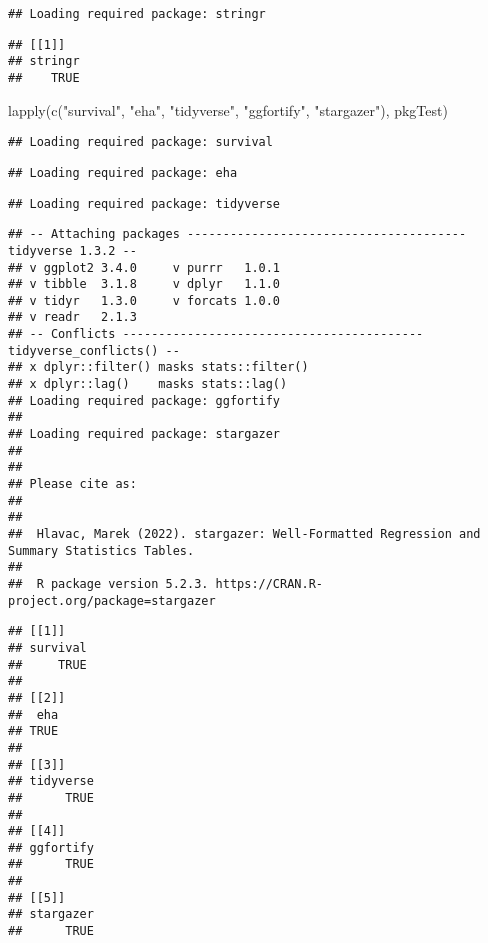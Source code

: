 \documentclass[
]{article}
\newenvironment{Shaded}{\begin{snugshade}}{\end{snugshade}}
\newcommand{\FunctionTok}[1]{\textcolor[rgb]{0.00,0.00,0.00}{#1}}
\newcommand{\NormalTok}[1]{#1}
\newcommand{\StringTok}[1]{\textcolor[rgb]{0.31,0.60,0.02}{#1}}
\begin{document}
\begin{verbatim}
## Loading required package: stringr
\end{verbatim}

\begin{verbatim}
## [[1]]
## stringr 
##    TRUE
\end{verbatim}

\begin{Shaded}
\begin{Highlighting}[]
\FunctionTok{lapply}\NormalTok{(}\FunctionTok{c}\NormalTok{(}\StringTok{"survival"}\NormalTok{, }\StringTok{"eha"}\NormalTok{, }\StringTok{"tidyverse"}\NormalTok{, }\StringTok{"ggfortify"}\NormalTok{, }\StringTok{"stargazer"}\NormalTok{),  pkgTest)}
\end{Highlighting}
\end{Shaded}

\begin{verbatim}
## Loading required package: survival
\end{verbatim}

\begin{verbatim}
## Loading required package: eha
\end{verbatim}

\begin{verbatim}
## Loading required package: tidyverse
\end{verbatim}

\begin{verbatim}
## -- Attaching packages --------------------------------------- tidyverse 1.3.2 --
## v ggplot2 3.4.0     v purrr   1.0.1
## v tibble  3.1.8     v dplyr   1.1.0
## v tidyr   1.3.0     v forcats 1.0.0
## v readr   2.1.3     
## -- Conflicts ------------------------------------------ tidyverse_conflicts() --
## x dplyr::filter() masks stats::filter()
## x dplyr::lag()    masks stats::lag()
## Loading required package: ggfortify
## 
## Loading required package: stargazer
## 
## 
## Please cite as: 
## 
## 
##  Hlavac, Marek (2022). stargazer: Well-Formatted Regression and Summary Statistics Tables.
## 
##  R package version 5.2.3. https://CRAN.R-project.org/package=stargazer
\end{verbatim}

\begin{verbatim}
## [[1]]
## survival 
##     TRUE 
## 
## [[2]]
##  eha 
## TRUE 
## 
## [[3]]
## tidyverse 
##      TRUE 
## 
## [[4]]
## ggfortify 
##      TRUE 
## 
## [[5]]
## stargazer 
##      TRUE
\end{verbatim}
\end{document}
